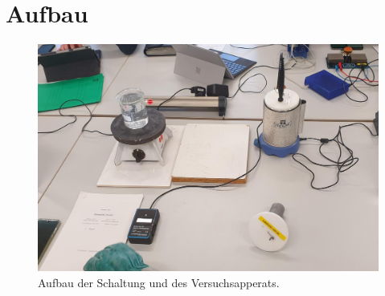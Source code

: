 \newpage
\section{Aufbau}
\label{sec:aufbau}

\begin{figure}
    \centering
    \includegraphics[scale=0.1]{content/Bilder/Aufbau.jpg}
    \caption{Aufbau der Schaltung und des Versuchsapperats.}
    \label{fig:aufbau}
\end{figure}